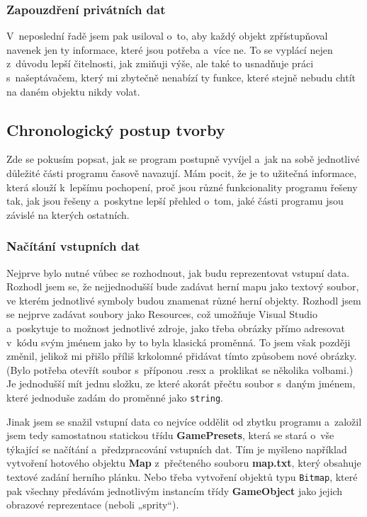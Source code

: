 \documentclass{article}
\begin{document}
\subsubsection{Zapouzdření privátních dat}
V~neposlední řadě jsem pak usiloval o~to, aby každý objekt zpřístupňoval navenek jen ty informace, které jsou potřeba a~více ne. To se vyplácí nejen z~důvodu lepší čitelnosti, jak zmiňuji výše, ale také to usnadňuje práci s~našeptávačem, který mi zbytečně nenabízí ty funkce, které stejně nebudu chtít na daném objektu nikdy volat.

\subsection{Chronologický postup tvorby}
Zde se pokusím popsat, jak se program postupně vyvíjel a~jak na sobě jednotlivé důležité části programu časově navazují. Mám pocit, že je to užitečná informace, která slouží k~lepšímu pochopení, proč jsou různé funkcionality programu řešeny tak, jak jsou řešeny a~poskytne lepší přehled o~tom, jaké části programu jsou závislé na kterých ostatních.

\subsubsection{Načítání vstupních dat}
Nejprve bylo nutné vůbec se rozhodnout, jak budu reprezentovat vstupní data. Rozhodl jsem se, že nejjednodušší bude zadávat herní mapu jako textový soubor, ve kterém jednotlivé symboly budou znamenat různé herní objekty. Rozhodl jsem se nejprve zadávat soubory jako Resources, což umožňuje Visual Studio a~poskytuje to možnost jednotlivé zdroje, jako třeba obrázky přímo adresovat v~kódu svým jménem jako by to byla klasická proměnná. To jsem však později změnil, jelikož mi přišlo příliš krkolomné přidávat tímto způsobem nové obrázky. (Bylo potřeba otevřít soubor s~příponou .resx a~proklikat se několika volbami.) Je jednodušší mít jednu složku, ze které akorát přečtu soubor s~daným jménem, které jednoduše zadám do proměnné jako \verb|string|.

Jinak jsem se snažil vstupní data co nejvíce oddělit od zbytku programu a~založil jsem tedy samostatnou statickou třídu \textbf{GamePresets}, která se stará o~vše týkající se načítání a~předzpracování vstupních dat. Tím je myšleno například vytvoření hotového objektu \textbf{Map} z~přečteného souboru \textbf{map.txt}, který obsahuje textové zadání herního plánku. Nebo třeba vytvoření objektů typu \verb|Bitmap|, které pak všechny předávám jednotlivým instancím třídy \textbf{GameObject} jako jejich obrazové reprezentace (neboli „sprity“).
\end{document}
